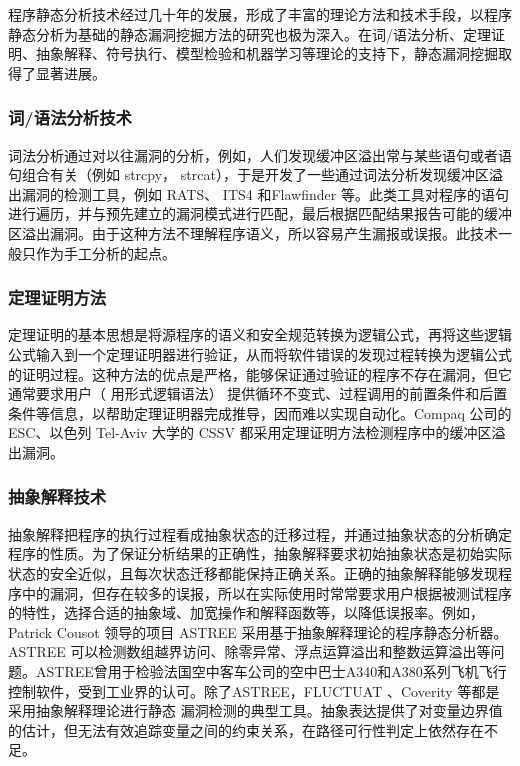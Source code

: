 程序静态分析技术经过几十年的发展，形成了丰富的理论方法和技术手段，以程序静态分析为基础的静态漏洞挖掘方法的研究也极为深入。在词/语法分析、定理证明、抽象解释、符号执行、模型检验和机器学习等理论的支持下，静态漏洞挖掘取得了显著进展。

\subsubsection{词/语法分析技术}

词法分析通过对以往漏洞的分析，例如，人们发现缓冲区溢出常与某些语句或者语句组合有关（例如 strcpy， strcat），于是开发了一些通过词法分析发现缓冲区溢出漏洞的检测工具，例如 RATS、 ITS4 和Flawfinder 等。此类工具对程序的语句进行遍历，并与预先建立的漏洞模式进行匹配，最后根据匹配结果报告可能的缓冲区溢出漏洞。由于这种方法不理解程序语义，所以容易产生漏报或误报。此技术一般只作为手工分析的起点。

\subsubsection{定理证明方法}

定理证明的基本思想是将源程序的语义和安全规范转换为逻辑公式，再将这些逻辑公式输入到一个定理证明器进行验证，从而将软件错误的发现过程转换为逻辑公式的证明过程。这种方法的优点是严格，能够保证通过验证的程序不存在漏洞，但它通常要求用户（ 用形式逻辑语法） 提供循环不变式、过程调用的前置条件和后置条件等信息，以帮助定理证明器完成推导，因而难以实现自动化。Compaq 公司的 ESC、以色列 Tel-Aviv 大学的 CSSV 都采用定理证明方法检测程序中的缓冲区溢出漏洞。

\subsubsection{抽象解释技术}

抽象解释把程序的执行过程看成抽象状态的迁移过程，并通过抽象状态的分析确定程序的性质。为了保证分析结果的正确性，抽象解释要求初始抽象状态是初始实际状态的安全近似，且每次状态迁移都能保持正确关系。正确的抽象解释能够发现程序中的漏洞，但存在较多的误报，所以在实际使用时常常要求用户根据被测试程序的特性，选择合适的抽象域、加宽操作和解释函数等，以降低误报率。例如， Patrick Cousot 领导的项目 ASTREE 采用基于抽象解释理论的程序静态分析器。ASTREE 可以检测数组越界访问、除零异常、浮点运算溢出和整数运算溢出等问题。ASTREE曾用于检验法国空中客车公司的空中巴士A340和A380系列飞机飞行控制软件，受到工业界的认可。除了ASTREE，FLUCTUAT 、Coverity 等都是采用抽象解释理论进行静态
漏洞检测的典型工具。抽象表达提供了对变量边界值的估计，但无法有效追踪变量之间的约束关系，在路径可行性判定上依然存在不足。


